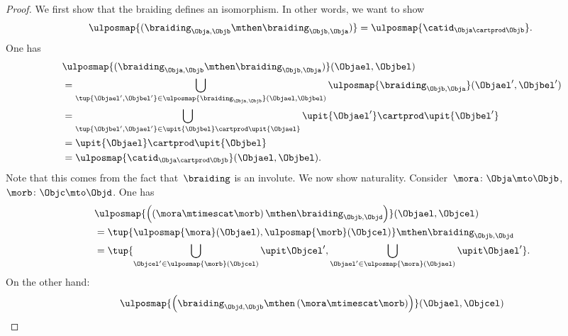 \begin{proof}
	We first show that the braiding defines an isomorphism.
	In other words, we want to show
	\begin{equation*}
		\ulposmap{(\braiding_{\Obja,\Objb}\mthen \braiding_{\Objb,\Obja})}=\ulposmap{\catid_{\Obja \cartprod \Objb}}.
	\end{equation*}
	One has
	\begin{equation*}
		\begin{aligned}
			~ & \ulposmap{(\braiding_{\Obja,\Objb}\mthen \braiding_{\Objb,\Obja})}(\Objael,\Objbel)                                                            \\
			  & =\bigcup_{\tup{\Objael',\Objbel'}\in \ulposmap{\braiding_{\Obja,\Objb}}(\Objael,\Objbel)}\ulposmap{\braiding_{\Objb,\Obja}}(\Objael',\Objbel') \\
			  & =\bigcup_{\tup{\Objbel',\Objael'}\in \upit\{\Objbel\}\cartprod \upit\{\Objael\}}\upit\{ \Objael'\}\cartprod \upit\{ \Objbel'\}                 \\
			  & =\upit\{\Objael\} \cartprod \upit\{\Objbel\}                                                                                                   \\
			  & =\ulposmap{\catid_{\Obja\cartprod \Objb}}(\Objael,\Objbel).
		\end{aligned}
	\end{equation*}
	Note that this comes from the fact that~$\braiding$ is an involute.
	We now show naturality.
	Consider~$\mora \colon \Obja \mto \Objb$,~$\morb\colon \Objc \mto \Objd$.
	One has
	\begin{equation}
		\label{eq:braid-upos-natural-a}
		\begin{aligned}
			~ & \ulposmap{\left(\left( \mora \mtimescat \morb\right)\mthen \braiding_{ \Objb, \Objd}\right)}(\Objael,\Objcel)                       \\
			  & = \tup{\ulposmap{\mora}(\Objael),\ulposmap{\morb}(\Objcel)}\mthen \braiding_{ \Objb, \Objd}                                         \\
			  & =\tup{\bigcup_{\Objcel'\in \ulposmap{\morb}(\Objcel)}\upit \Objcel',\bigcup_{\Objael'\in \ulposmap{\mora}(\Objael)}\upit \Objael'}.
		\end{aligned}
	\end{equation}
	On the other hand:
	\begin{equation}
		\label{eq:braid-upos-natural-b}
		\begin{aligned}
			~ & \ulposmap{\left(\braiding_{ \Objd, \Objb}\mthen \left( \mora \mtimescat \morb\right)\right)}(\Objael,\Objcel)                              \\

\end{aligned}
\end{equation}
\end{proof}
